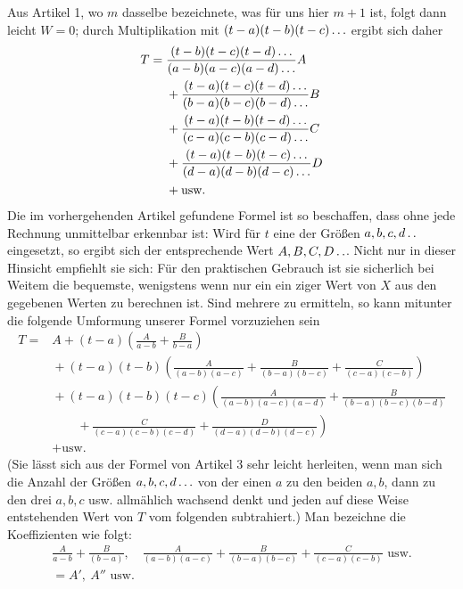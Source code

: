 Aus Artikel 1, wo $m$ dasselbe bezeichnete, was für uns hier $m+1$ ist, folgt dann leicht $W=0$; durch Multiplikation mit $(t-a)(t-b)(t-c)\mathinner{.\,.\,.}$ ergibt sich daher
\[
\begin{aligned}
T={}&\frac{(t-b)(t-c)(t-d)\mathinner{.\,.\,.}}{(a-b)(a-c)(a-d)\mathinner{.\,.\,.}}A\\
&{}+\frac{(t-a)(t-c)(t-d)\mathinner{.\,.\,.}}{(b-a)(b-c)(b-d)\mathinner{.\,.\,.}}B\\
&{}+\frac{(t-a)(t-b)(t-d)\mathinner{.\,.\,.}}{(c-a)(c-b)(c-d)\mathinner{.\,.\,.}}C\\
&{}+\frac{(t-a)(t-b)(t-c)\mathinner{.\,.\,.}}{(d-a)(d-b)(d-c)\mathinner{.\,.\,.}}D\\
&{}+\text{usw.}
\end{aligned}
\]
Die im vorhergehenden Artikel gefundene Formel ist so beschaffen, dass ohne jede Rechnung unmittelbar erkennbar ist: Wird für $t$ eine der Größen $a,b,c,d\mathinner{.\,.}$ eingesetzt, so ergibt sich der
entsprechende Wert $A,B,C,D\mathinner{.\,.}$. Nicht nur in dieser Hinsicht empfiehlt sie sich: Für den praktischen Gebrauch ist sie sicherlich bei Weitem die bequemste, wenigstens wenn nur ein ein%
ziger Wert von $X$ aus den gegebenen Werten zu berechnen ist. Sind mehrere
zu ermitteln, so kann mitunter die folgende Umformung unserer Formel
vorzuziehen sein
\[
\begin{aligned}
T={}&A+(t-a)\left(\frac{A}{a-b}+\frac{B}{b-a}\right)\\
&{}+(t-a)(t-b)\left(\frac{A}{(a-b)(a-c)}+\frac{B}{(b-a)(b-c)}+\frac{C}{(c-a)(c-b)}\right)\\
&{}+(t-a)(t-b)(t-c)\left(\frac{A}{(a-b)(a-c)(a-d)}+\frac{B}{(b-a)(b-c)(b-d)}\right.\\
&\qquad\left.{}+\frac{C}{(c-a)(c-b)(c-d)}+\frac{D}{(d-a)(d-b)(d-c)}\right)\\
&{}+\text{usw.}
\end{aligned}
\]
(Sie lässt sich aus der Formel von Artikel 3 sehr leicht herleiten, wenn man sich die Anzahl der Größen
$a,b,c,d\mathinner{.\,.\,.}$ von der einen $a$ zu den beiden $a,b$, dann zu den drei $a,b,c$ usw. allmählich wachsend denkt
und jeden auf diese Weise entstehenden Wert von $T$ vom folgenden subtrahiert.)
Man bezeichne die Koeffizienten wie folgt:
\[
\begin{gathered}\frac{A}{a-b}+\frac{B}{(b-a)},\quad
\frac{A}{(a-b)(a-c)}+\frac{B}{(b-a)(b-c)}+\frac{C}{(c-a)(c-b)}\text{ usw.}\\
=A',\ A''\text{ usw.}\end{gathered}
\]
